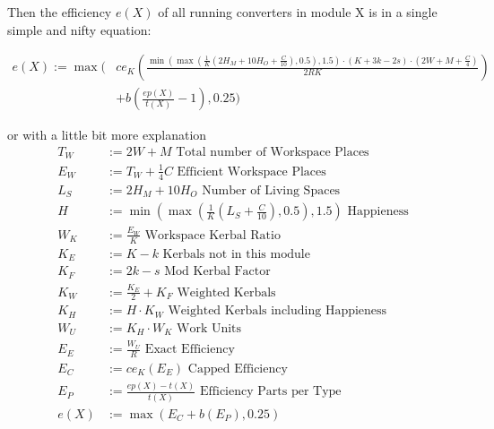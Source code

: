 \documentclass[11pt]{report}
\begin{document}
Then the efficiency $e(X)$ of all running converters in module X is in
a single simple and nifty equation:

\begin{align*}
  e(X) := \max\Bigg( & ce_K\left(\frac{\min\left(\max\left(\frac{1}{K}\left(2H_M+10H_O+\frac{C}{10}\right), 0.5\right), 1.5\right)\cdot \left(K + 3k -2s\right)\cdot \left(2W+M+\frac{C}{4}\right)}{2RK}\right)\\
    & + b\left(\frac{ep(X)}{t(X)}-1\right), 0.25\Bigg)
\end{align*}

or with a little bit more explanation
\begin{align*}
  T_W & := 2W+M \textrm{ Total number of Workspace Places}\\
  E_W & := T_W+\frac{1}{4}C \textrm{ Efficient Workspace Places}\\
  L_S & := 2H_M+10H_O \textrm{ Number of Living Spaces}\\
  H & := \min\left(\max\left(\frac{1}{K}\left(L_S+\frac{C}{10}\right), 0.5\right), 1.5\right) \textrm{ Happieness}\\
  W_K & := \frac{E_W}{K} \textrm{ Workspace Kerbal Ratio}\\
  K_E & := K - k \textrm{ Kerbals not in this module}\\
  K_F & := 2k-s \textrm{ Mod Kerbal Factor}\\
  K_W & := \frac{K_E}{2}+K_F \textrm{ Weighted Kerbals}\\
  K_H & := H\cdot K_W \textrm{ Weighted Kerbals including Happieness}\\
  W_U & := K_H\cdot W_K \textrm{ Work Units}\\
  E_E & := \frac{W_U}{R} \textrm{ Exact Efficiency}\\
  E_C & := ce_K(E_E) \textrm{ Capped Efficiency}\\
  E_P & := \frac{ep(X)-t(X)}{t(X)} \textrm{ Efficiency Parts per Type}\\
  e(X) & := \max(E_C+b(E_P), 0.25)
\end{align*}
\end{document}
